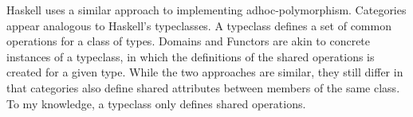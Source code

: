 \documentclass[a4paper,fleqn,notitlepage]{scrartcl}
\begin{document}
Haskell uses a similar approach to implementing adhoc-polymorphism. Categories 
appear analogous to Haskell's typeclasses. A typeclass defines a set of common
operations for a class of types. Domains and Functors are akin to concrete
instances of a typeclass, in which the definitions of the shared operations is
created for a given type. While the two approaches are similar, they still differ
in that categories also define shared attributes between members of the same class.
To my knowledge, a typeclass only defines shared operations.
\end{document}
